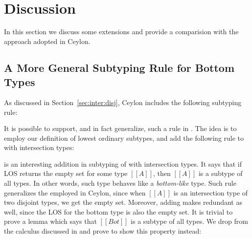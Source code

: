 \section{Discussion}
\label{sec:discussion}
In this section we discuss some extensions and provide a comparision with the approach
adopted in Ceylon.

\subsection{A More General Subtyping Rule for Bottom  Types}
\label{sec:inter:refactoring}
As discussed in Section~\ref{sec:inter:disj}, Ceylon includes the following subtyping rule:

\begin{center}
\end{center}

\noindent It is possible to support, and in fact generalize, such a rule in \name. The idea is to
employ our definition of lowest ordinary subtypes, and add the following rule 
to \cal with intersection types:

\begin{center}
\end{center}

\noindent {} is an interesting addition in subtyping of \cal with intersection types.
It says that if LOS returns the empty set for some type $[[A]]$, then $[[A]]$
is a subtype of all types. In other words, such type behaves like a \emph{bottom-like} type.
Such rule generalizes the 
employed in Ceylon, since when $[[A]]$ is an intersection type of two
disjoint types, we get the empty set.
Moreover, adding  makes  redundant as well, since the LOS for
the bottom type is also the empty set. It is trivial to prove a lemma which says that $[[Bot]]$ is a subtype of all types. We drop  from the calculus discussed in 
and prove  to show this property instead:

